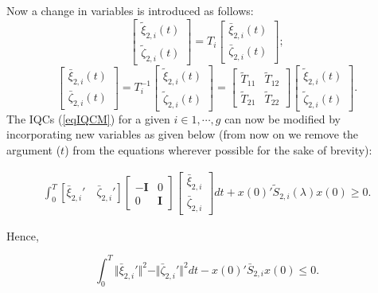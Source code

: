 \documentclass[twocolumn]{autart}
\begin{document}
Now a change in variables is introduced as follows:
\begin{equation}
\label{eqchvar1}
\left[
\begin{array}{c}
\tilde{\xi}_{2,i}(t)\\
\tilde{\zeta}_{2,i}(t)
\end{array}\right]=T_i \left[
\begin{array}{c}
\bar{\xi}_{2,i}(t)\\
\bar{\zeta}_{2,i}(t)
\end{array}\right];
\end{equation}
\begin{equation}
\label{eqchvar2}
\left[
\begin{array}{c}
\bar{\xi}_{2,i}(t)\\
\bar{\zeta}_{2,i}(t)
\end{array}\right]=T_i^{-1}\left[
\begin{array}{c}
\tilde{\xi}_{2,i}(t)\\
\tilde{\zeta}_{2,i}(t)
\end{array}\right]=\left[
\begin{array}{cc}
\tilde{T}_{11} & \tilde{T}_{12}\\
\tilde{T}_{21} & \tilde{T}_{22}
\end{array}\right] \left[
\begin{array}{c}
\tilde{\xi}_{2,i}(t)\\
\tilde{\zeta}_{2,i}(t)
\end{array}\right].
\end{equation}
The IQCs (\ref{eqIQCM}) for a given $i\in {1,\cdots,g}$ can now  be modified by incorporating new variables as given below (from now on we remove the argument ($t$) from the equations wherever possible for the sake of brevity):
\begin{small}
\begin{equation}
\label{eqnIQC}
\begin{split}
\int_0^T[\bar{\xi}_{2,i}' \quad \bar{\zeta}_{2,i}']\left[
\begin{array}{cc}
-\textbf{I} & 0\\
0 & \textbf{I}
\end{array}\right]\left[
\begin{array}{c}
\bar{\xi}_{2,i}\\
\bar{\zeta}_{2,i}
\end{array}\right]dt
+x(0)'\tilde{S}_{2,i}(\lambda)x(0)\geq0.
\end{split}
\end{equation}\end{small}
Hence,
\begin{small}
\begin{equation}
\label{eqnnIQC}
\int_0^T\Vert\bar{\xi}_{2,i}'\Vert^2- \Vert \bar{\zeta}_{2,i}'\Vert^2 dt -x(0)'\bar{S}_{2,i}x(0)\leq0.
\end{equation}\end{small}  
\end{document}

